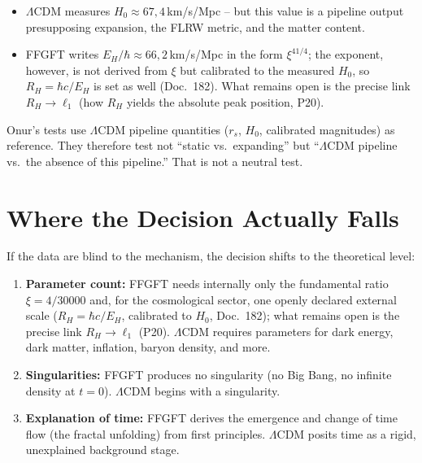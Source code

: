 \begin{itemize}
  \item $\Lambda$CDM measures $H_0 \approx 67{,}4$\,km/s/Mpc -- but this
        value is a pipeline output presupposing expansion, the FLRW metric,
        and the matter content.
  \item FFGFT writes $E_H/\hbar \approx 66{,}2$\,km/s/Mpc in the form
        $\xi^{41/4}$; the exponent, however, is not derived from $\xi$ but
        calibrated to the measured $H_0$, so $R_H = \hbar c/E_H$ is set as well
        (Doc.~182). What remains open is the precise link $R_H \to \ell_1$
        (how $R_H$ yields the absolute peak position, P20).
\end{itemize}

Onur's tests use $\Lambda$CDM pipeline quantities ($r_s$, $H_0$, calibrated
magnitudes) as reference. They therefore test not ``static vs.\ expanding''
but ``$\Lambda$CDM pipeline vs.\ the absence of this pipeline.'' That is not
a neutral test.

\section{Where the Decision Actually Falls}

If the data are blind to the mechanism, the decision shifts to the
theoretical level:

\begin{enumerate}
  \item \textbf{Parameter count:} FFGFT needs internally only the
        fundamental ratio $\xi = 4/30000$ and, for the cosmological sector,
        one openly declared external scale ($R_H = \hbar c/E_H$, calibrated
        to $H_0$, Doc.~182); what remains open is the precise
        link $R_H \to \ell_1$ (P20). $\Lambda$CDM requires parameters for
        dark energy, dark matter, inflation, baryon density, and more.
  \item \textbf{Singularities:} FFGFT produces no singularity (no Big Bang,
        no infinite density at $t=0$). $\Lambda$CDM begins with a singularity.
  \item \textbf{Explanation of time:} FFGFT derives the emergence and change
        of time flow (the fractal unfolding) from first principles.
        $\Lambda$CDM posits time as a rigid, unexplained background stage.
\end{enumerate}


